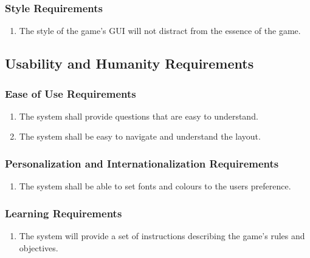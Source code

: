 \documentclass[titlepage]{article}
\newcounter{req}
\begin{document}
		\subsubsection{Style Requirements}
		\label{ssub:style_requirements}
		\begin{enumerate}[{LF}1. ]
		\setcounter{enumi}{\value{req}}
			\item 
			The style of the game's GUI will not distract from the essence of the game.
		\setcounter{req}{\theenumi}
		\end{enumerate}
		
		
		\subsection{Usability and Humanity Requirements}
		\setcounter{req}{0}
		\label{sub:usability_and_humanity_requirements}
		
		
		\subsubsection{Ease of Use Requirements}
		\label{ssub:ease_of_use_requirements}
		\begin{enumerate}[{UH}1.]
		\setcounter{enumi}{\value{req}}
			\item 
			The system shall provide questions that are easy to understand.
			\item
			The system shall be easy to navigate and understand the layout.
		\setcounter{req}{\theenumi}
		\end{enumerate}
		
		\subsubsection{Personalization and Internationalization Requirements}
		\label{ssub:personalization_and_internationalization_requirements}
		\begin{enumerate}[{UH}1. ]
		\setcounter{enumi}{\value{req}}
			\item
			The system shall be able to set fonts and colours to the users preference.
		\setcounter{req}{\theenumi}
		\end{enumerate}
		
		\subsubsection{Learning Requirements}
		\label{ssub:learning_requirements}
		\begin{enumerate}[{UH}1. ]
		\setcounter{enumi}{\value{req}}
			\item
			The system will provide a set of instructions describing the game's rules and objectives.
		\setcounter{req}{\theenumi}
		\end{enumerate}
		
\end{document}
